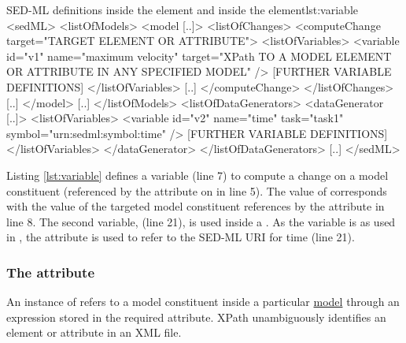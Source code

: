 %
%
\begin{myXmlLst}{SED-ML  definitions inside the  element and inside the  element}{lst:variable}
<sedML>
 <listOfModels>
  <model [..]>
   <listOfChanges>
    <computeChange target="TARGET ELEMENT OR ATTRIBUTE">
     <listOfVariables>
       <variable id="v1" name="maximum velocity" 
        target="XPath TO A MODEL ELEMENT OR ATTRIBUTE IN ANY SPECIFIED MODEL" />
      [FURTHER VARIABLE DEFINITIONS]
     </listOfVariables>
     [..]
    </computeChange>
   </listOfChanges>
   [..]
  </model>
  [..]
 </listOfModels>
 <listOfDataGenerators>
  <dataGenerator [..]>
   <listOfVariables>
    <variable id="v2" name="time" task="task1" symbol="urn:sedml:symbol:time" />
      [FURTHER VARIABLE DEFINITIONS]
   </listOfVariables>
  </dataGenerator>
 </listOfDataGenerators>
 [..]
</sedML>
\end{myXmlLst}
%
Listing \ref{lst:variable} defines a variable  (line 7) to compute a change on a model constituent (referenced by the  attribute on  in line 5). The value of  corresponds with the value of the targeted model constituent references by the  attribute in line 8. 
The second variable,  (line 21), is used inside a . As the variable is  as used in  , the  attribute is used to refer to the SED-ML URI for time (line 21).

\subsubsection{The  attribute}
\label{sec:target}
An instance of  refers to a model constituent inside a particular \hyperref[class:model]{model} through an  expression stored in the required  attribute. 
%
XPath  unambiguously identifies an element or attribute in an XML file.

